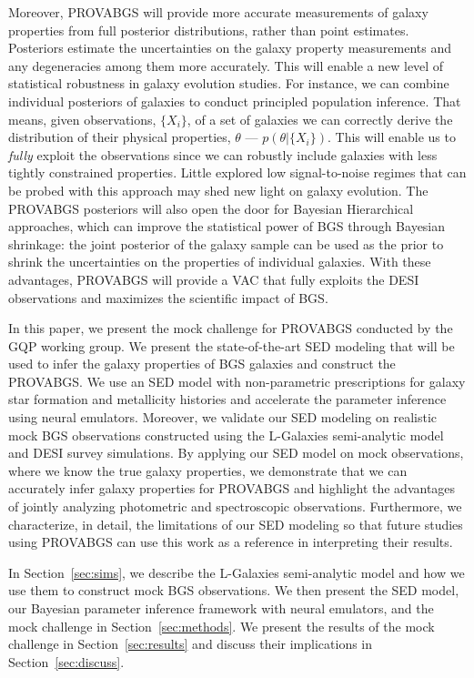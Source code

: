 Moreover, PROVABGS will provide more accurate measurements of galaxy properties
from full posterior distributions, rather than point estimates. 
Posteriors estimate the uncertainties on the galaxy property measurements and
any degeneracies among them more accurately. 
This will enable a new level of statistical robustness in galaxy evolution
studies.
For instance, we can combine individual posteriors of galaxies to conduct
principled population inference.
That means, given observations, $\{X_i\}$, of a set of galaxies we can
correctly derive the distribution of their physical properties, $\theta$ ---
$p(\theta | \{ X_i \})$.
This will enable us to \emph{fully} exploit the observations since we can
robustly include galaxies with less tightly constrained properties.  
Little explored low signal-to-noise regimes that can be probed with this
approach may shed new light on galaxy evolution.
The PROVABGS posteriors will also open the door for Bayesian Hierarchical
approaches, which can improve the statistical power of BGS through Bayesian
shrinkage: the joint posterior of the galaxy sample can be used as the
prior to shrink the uncertainties on the properties of individual galaxies. 
With these advantages, PROVABGS will provide a VAC that fully exploits the
DESI observations and maximizes the scientific impact of BGS. 

In this paper, we present the mock challenge for PROVABGS conducted by the GQP
working group. 
We present the state-of-the-art SED modeling that will be used to infer the
galaxy properties of BGS galaxies and construct the PROVABGS. 
We use an SED model with non-parametric prescriptions for galaxy star formation
and metallicity histories and accelerate the parameter inference using neural
emulators. 
Moreover, we validate our SED modeling on realistic mock BGS observations
constructed using the {\sc L-Galaxies} semi-analytic
model~\citep{henriques2015} and DESI survey simulations. 
By applying our SED model on mock observations, where we know the true galaxy
properties, we demonstrate that we can accurately infer galaxy properties for
PROVABGS and highlight the advantages of jointly analyzing photometric and
spectroscopic observations. 
Furthermore, we characterize, in detail, the limitations of our SED modeling so
that future studies using PROVABGS can use this work as a reference in
interpreting their results. 

In Section~\ref{sec:sims}, we describe the {\sc L-Galaxies} semi-analytic
model and how we use them to construct mock BGS observations. 
We then present the SED model, our Bayesian parameter inference framework with
neural emulators, and the mock challenge in Section~\ref{sec:methods}. 
We present the results of the mock challenge in Section~\ref{sec:results} and
discuss their implications in Section~\ref{sec:discuss}. 

